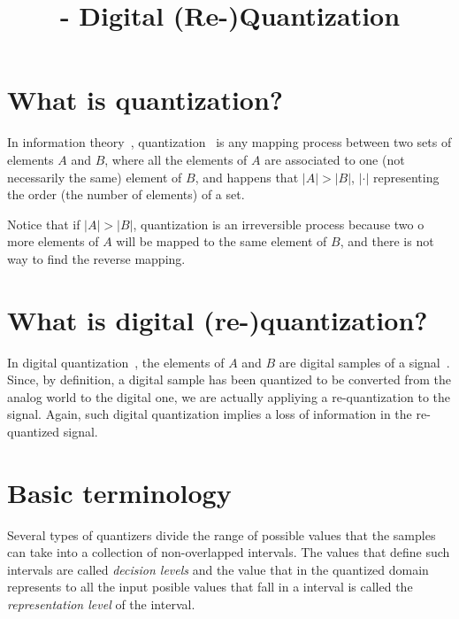 


\title{\SM{} - Digital (Re-)Quantization}

\maketitle

\tableofcontents

\section{What is quantization?}

In information theory~\cite{vruiz__information_theory},
quantization~\cite{vruiz__signal_quantization,vruiz__scalar_quantization,vruiz__vector_quantization,vruiz__trellis_quantization}
is any mapping process between two sets of elements $A$ and $B$, where
all the elements of $A$ are associated to one (not necessarily the
same) element of $B$, and happens that $|A|>|B|$, $|\cdot|$
representing the order (the number of elements) of a set.

Notice that if $|A|>|B|$, quantization is an irreversible process
because two o more elements of $A$ will be mapped to the same element
of $B$, and there is not way to find the reverse mapping.

\section{What is digital (re-)quantization?}

In digital
quantization~\cite{vruiz__scalar_quantization,vruiz__vector_quantization},
the elements of $A$ and $B$ are digital samples of a
signal~\cite{vruiz__signal_quantization}. Since, by definition, a
digital sample has been quantized to be converted from the analog
world to the digital one, we are actually appliying a re-quantization
to the signal. Again, such digital quantization implies a loss of
information in the re-quantized signal.

\section{Basic terminology}

Several types of quantizers divide the range of possible values that
the samples can take into a collection of non-overlapped
intervals. The values that define such intervals are called
\emph{decision levels} and the value that in the quantized domain
represents to all the input posible values that fall in a interval is
called the \emph{representation level} of the interval.

